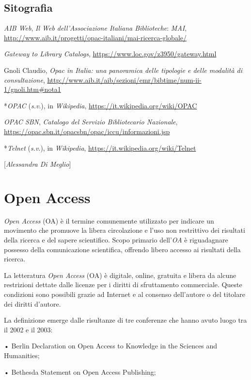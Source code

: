 \section*{Sitografia}
{\parindent0pt 
\emph{AIB Web}, \emph{Il Web dell'Associazione Italiana Biblioteche}:
\emph{MAI},
\url{http://www.aib.it/progetti/opac-italiani/mai-ricerca-globale/}

\emph{Gateway to Library Catalogs},
\url{https://www.loc.gov/z3950/gateway.html}

Gnoli Claudio, \emph{Opac in Italia: una panoramica delle tipologie e
delle modalità di consultazione},
\url{http://www.aib.it/aib/sezioni/emr/bibtime/num-ii-1/gnoli.htm\#nota1}

*\emph{OPAC} (\emph{s.v}.), in \emph{Wikipedia},
\url{https://it.wikipedia.org/wiki/OPAC}

\emph{OPAC SBN}, \emph{Catalogo del Servizio Bibliotecario Nazionale},
\url{https://opac.sbn.it/opacsbn/opac/iccu/informazioni.jsp}

*\emph{Telnet} (\emph{s.v}.), in \emph{Wikipedia},
\url{https://it.wikipedia.org/wiki/Telnet}
}

\hrulefill 

{[}\emph{Alessandra Di Meglio}{]}




\chapter{Open Access}

\emph{Open Access} (OA) è il termine comunemente utilizzato per indicare
un movimento che promuove la libera circolazione e l'uso non restrittivo
dei risultati della ricerca e del sapere scientifico. Scopo primario
dell'\emph{OA} è riguadagnare possesso della comunicazione scientifica,
offrendo libero accesso ai risultati della ricerca.

La letteratura \emph{Open Access} (OA) è digitale, online, gratuita e
libera da alcune restrizioni dettate dalle licenze per i diritti di
sfruttamento commerciale. Queste condizioni sono possibili grazie ad
Internet e al consenso dell'autore o del titolare dei diritti d'autore.

La definizione emerge dalle risultanze di tre conferenze che hanno avuto
luogo tra il 2002 e il 2003:

• Berlin Declaration on Open Access to Knowledge in the Sciences and
Humanities;

• Bethesda Statement on Open Access Publishing;

